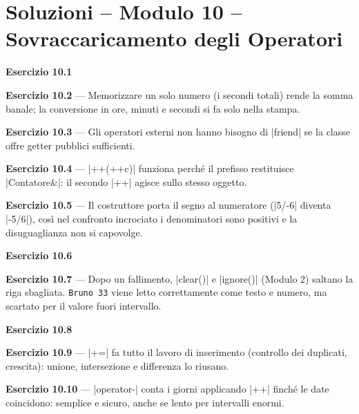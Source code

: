 \chapter{Soluzioni -- Modulo 10 -- Sovraccaricamento degli Operatori}

\textbf{Esercizio 10.1}

\textbf{Esercizio 10.2} --- Memorizzare un solo numero (i secondi totali) rende la
somma banale; la conversione in ore, minuti e secondi si fa solo nella stampa.

\textbf{Esercizio 10.3} --- Gli operatori esterni non hanno bisogno di \cc|friend| se la
classe offre getter pubblici sufficienti.

\textbf{Esercizio 10.4} --- \cc|++(++c)| funziona perché il prefisso restituisce
\cc|Contatore&|: il secondo \cc|++| agisce sullo stesso oggetto.

\textbf{Esercizio 10.5} --- Il costruttore porta il segno al numeratore (\cc|5/-6|
diventa \cc|-5/6|), così nel confronto incrociato i denominatori sono positivi e la
disuguaglianza non si capovolge.

\textbf{Esercizio 10.6}

\textbf{Esercizio 10.7} --- Dopo un fallimento, \cc|clear()| e \cc|ignore()| (Modulo 2)
saltano la riga sbagliata. \texttt{Bruno 33} viene letto correttamente come testo e
numero, ma scartato per il valore fuori intervallo.

\textbf{Esercizio 10.8}

\textbf{Esercizio 10.9} --- \cc|+=| fa tutto il lavoro di inserimento (controllo dei
duplicati, crescita): unione, intersezione e differenza lo riusano.

\textbf{Esercizio 10.10} --- \cc|operator-| conta i giorni applicando \cc|++| finché le
date coincidono: semplice e sicuro, anche se lento per intervalli enormi.
